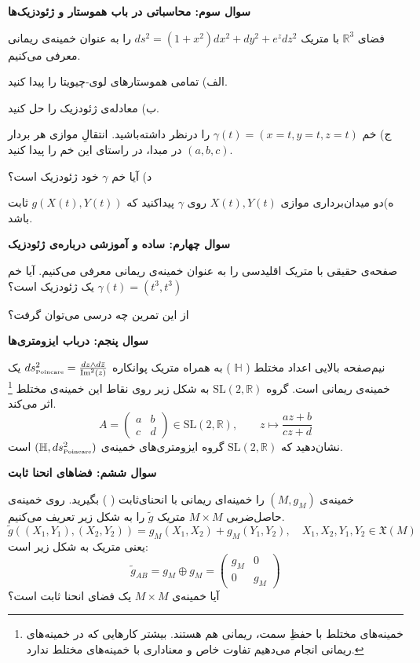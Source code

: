 \documentclass[a4paper, 12pt]{article}
\newenvironment{parind}{%
	\par%
	\medskip
	\leftskip=0mm\rightskip=7mm
	\noindent\ignorespaces}{%
	\par\medskip}
\begin{document}
\newpage
\textbf{سوال سوم: محاسباتی در باب هموستار و ژئودزیک‌ها}

\vspace{0.7em}
فضای 
$\mathbb{R}^3$
 با متریک
 $ds^2 = (1+x^2)dx^2 + dy^2 + e^z dz^2$
 را به عنوان خمینه‌ی ریمانی معرفی می‌کنیم.
 
\begin{parind}
	الف) تمامی هموستار‌های لوی-چیویتا را پیدا کنید.
	
	ب) معادله‌ی ژئودزیک را حل کنید.
	
	ج) خم
	$\gamma(t) = (x=t,y=t,z=t)$
	 را درنظر داشته‌باشید. انتقالِ موازی هر بردار 
	 $(a,b,c)$ در مبدا، در راستای این خم را پیدا کنید.
	 
	 د) آیا خم $\gamma$ خود ژئودزیک است؟
	 
	 ه)دو میدان‌برداری موازی 
	 $X(t),Y(t)$
	 روی 
	 $\gamma$
	 پیداکنید که 
	 $g(X(t),Y(t))$
	 ثابت باشد.
\end{parind}

\newpage
\textbf{سوال چهارم: ساده و آموزشی درباره‌ی ژئودزیک}

\vspace{0.7em}
صفحه‌ی حقیقی با متریک اقلیدسی را به عنوان خمینه‌ی ریمانی معرفی می‌کنیم. آیا خم
$\gamma(t) = (t^3,t^3)$
یک ژئودزیک است؟

از این تمرین چه درسی می‌توان گرفت؟


\newpage
\textbf{سوال پنجم: درباب ایزومتری‌ها}

\vspace{0.7em}
نیم‌صفحه بالایی اعداد مختلط 
(
$\mathbb{H}$
)
 به همراه متریک پوانکاره
 $ds^2_{\text{\tiny Poincare}} = \frac{dz\wedge d\bar{z}}{\text{Im}^2(z)}$
 یک خمینه‌ی ریمانی است. گروه 
 $\text{SL}(2,\mathbb{R})$
 به شکل زیر روی نقاط این خمینه‌ی مختلط
 \footnote{خمینه‌های مختلط با حفظِ سمت، ریمانی هم هستند. بیشتر کارهایی که در خمینه‌های ریمانی انجام می‌دهیم تفاوت خاص و معناداری با خمینه‌های مختلط ندارد.}
  اثر می‌کند.
 \[
 A = \begin{pmatrix}
 	a & b \\ c& d
 \end{pmatrix} \in \text{SL}(2,\mathbb{R}), \qquad z \longmapsto \frac{az+b}{cz+d}
 \]
 نشان‌دهید که 
  $\text{SL}(2,\mathbb{R})$
  گروه ایزومتری‌های خمینه‌ی 
  $(\mathbb{H},ds^2_{\text{\tiny Poincare}})$
  است.

\newpage
\textbf{سوال ششم: فضاهای انحنا ثابت}

\vspace{0.7em}
خمینه‌ی 
$(M,g_M)$
را خمینه‌ای ریمانی با انحنای‌ثابت (
)
بگیرید. روی خمینه‌ی حاصل‌ضربی
$M\times M$
متریک 
$\tilde{g}$
را به شکل زیر تعریف می‌کنیم.
\[
\tilde{g}((X_1,Y_1),(X_2,Y_2)) = g_M(X_1,X_2) + g_M(Y_1,Y_2), \quad X_1,X_2,Y_1,Y_2 \in \mathfrak{X}(M)
\]
یعنی متریک به شکل زیر است:
\[
\tilde{g}_{AB} = g_M \oplus g_M = \begin{pmatrix}
	g_M & 0 \\ 0 & g_M
\end{pmatrix}
\]
آیا خمینه‌ی 
$M\times M$
یک فضای انحنا ثابت است؟
\end{document}
